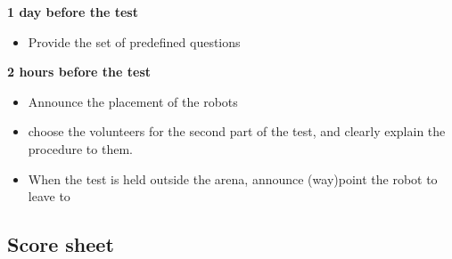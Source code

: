 \textbf{1 day before the test}
\begin{itemize}
    \item Provide the set of predefined questions
\end{itemize}

\textbf{2 hours before the test}
\begin{itemize}
    \item Announce the placement of the robots
    \item choose the volunteers for the second part of the test, and clearly explain the procedure to them.
    \item When the test is held outside the arena, announce (way)point the robot to leave to
\end{itemize}

\newpage
\subsection{Score sheet}


